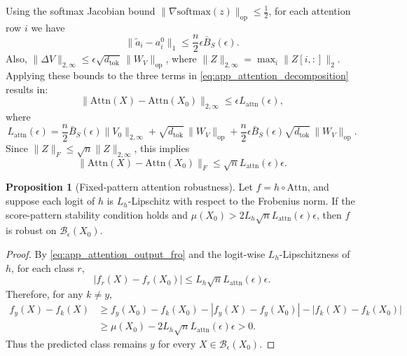 \documentclass{article}
\theoremstyle{definition}
\newtheorem{proposition}[theorem]{Proposition}
\begin{document}
Using the softmax Jacobian bound $\|\nabla \mathrm{softmax}(z)\|_{\mathrm{op}}\leq \frac{1}{2}$, for each attention row $i$ we have
\begin{equation}
    \|\widetilde a_i-a_i^0\|_1
    \leq
    \frac{n}{2}\epsilon\bar B_S(\epsilon).
    \label{eq:app_attention_weight_bound}
\end{equation}
Also, $\|\Delta V\|_{2,\infty}\leq \epsilon\sqrt{d_{\mathrm{tok}}}\,\|W_V\|_{\mathrm{op}}$, where $\|Z\|_{2,\infty}=\max_i\|Z[i,:]\|_2$. Applying these bounds to the three terms in \eqref{eq:app_attention_decomposition} results in:
\begin{equation}
    \|\mathrm{Attn}(X)-\mathrm{Attn}(X_0)\|_{2,\infty}
    \leq
    \epsilon L_{\mathrm{attn}}(\epsilon),
    \label{eq:app_attention_output_2inf}
\end{equation}
where
\begin{equation}
    L_{\mathrm{attn}}(\epsilon)
    =
    \frac{n}{2}\bar B_S(\epsilon)\|V_0\|_{2,\infty}
    +
    \sqrt{d_{\mathrm{tok}}}\,\|W_V\|_{\mathrm{op}}
    +
    \frac{n}{2}\epsilon\bar B_S(\epsilon)\sqrt{d_{\mathrm{tok}}}\,\|W_V\|_{\mathrm{op}}.
    \label{eq:app_attention_Lattn}
\end{equation}
Since $\|Z\|_F\leq\sqrt n\|Z\|_{2,\infty}$, this implies
\begin{equation}
    \|\mathrm{Attn}(X)-\mathrm{Attn}(X_0)\|_F
    \leq
    \sqrt n L_{\mathrm{attn}}(\epsilon)\epsilon.
    \label{eq:app_attention_output_fro}
\end{equation}

\begin{proposition}[Fixed-pattern attention robustness]
Let $f=h\circ\mathrm{Attn}$, and suppose each logit of $h$ is $L_h$-Lipschitz with respect to the Frobenius norm. If the score-pattern stability condition holds and $\mu(X_0)>2L_h\sqrt n L_{\mathrm{attn}}(\epsilon)\epsilon$, then $f$ is robust on $\mathcal B_\epsilon(X_0)$.
\end{proposition}

\begin{proof}
By \eqref{eq:app_attention_output_fro} and the logit-wise $L_h$-Lipschitzness of $h$, for each class $r$,
\begin{equation}
    |f_r(X)-f_r(X_0)|
    \leq
    L_h\sqrt n L_{\mathrm{attn}}(\epsilon)\epsilon.
\end{equation}
Therefore, for any $k\neq y$,
\begin{equation}
\begin{aligned}
    f_y(X)-f_k(X)
    &\geq
    f_y(X_0)-f_k(X_0)
    -
    |f_y(X)-f_y(X_0)|
    -
    |f_k(X)-f_k(X_0)| \\
    &\geq
    \mu(X_0)-2L_h\sqrt n L_{\mathrm{attn}}(\epsilon)\epsilon
    >
    0.
\end{aligned}
\end{equation}
Thus the predicted class remains $y$ for every $X\in\mathcal B_\epsilon(X_0)$.
\end{proof}
\end{document}
